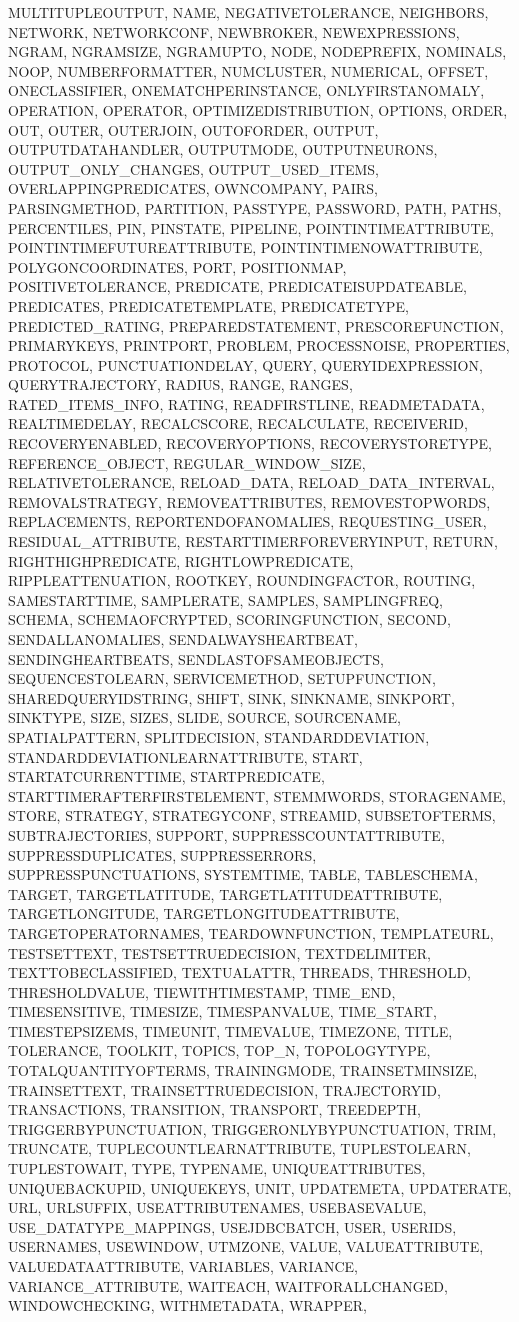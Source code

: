 {{MULTITUPLEOUTPUT, NAME, NEGATIVETOLERANCE, NEIGHBORS, NETWORK, NETWORKCONF, NEWBROKER, NEWEXPRESSIONS, NGRAM, NGRAMSIZE, NGRAMUPTO, NODE, NODEPREFIX, NOMINALS, NOOP, NUMBERFORMATTER, NUMCLUSTER, NUMERICAL, OFFSET, ONECLASSIFIER, ONEMATCHPERINSTANCE, ONLYFIRSTANOMALY, OPERATION, OPERATOR, OPTIMIZEDISTRIBUTION, OPTIONS, ORDER, OUT, OUTER, OUTERJOIN, OUTOFORDER, OUTPUT, OUTPUTDATAHANDLER, OUTPUTMODE, OUTPUTNEURONS, OUTPUT_ONLY_CHANGES, OUTPUT_USED_ITEMS, OVERLAPPINGPREDICATES, OWNCOMPANY, PAIRS, PARSINGMETHOD, PARTITION, PASSTYPE, PASSWORD, PATH, PATHS, PERCENTILES, PIN, PINSTATE, PIPELINE, POINTINTIMEATTRIBUTE, POINTINTIMEFUTUREATTRIBUTE, POINTINTIMENOWATTRIBUTE, POLYGONCOORDINATES, PORT, POSITIONMAP, POSITIVETOLERANCE, PREDICATE, PREDICATEISUPDATEABLE, PREDICATES, PREDICATETEMPLATE, PREDICATETYPE, PREDICTED_RATING, PREPAREDSTATEMENT, PRESCOREFUNCTION, PRIMARYKEYS, PRINTPORT, PROBLEM, PROCESSNOISE, PROPERTIES, PROTOCOL, PUNCTUATIONDELAY, QUERY, QUERYIDEXPRESSION, QUERYTRAJECTORY, RADIUS, RANGE, RANGES, RATED_ITEMS_INFO, RATING, READFIRSTLINE, READMETADATA, REALTIMEDELAY, RECALCSCORE, RECALCULATE, RECEIVERID, RECOVERYENABLED, RECOVERYOPTIONS, RECOVERYSTORETYPE, REFERENCE_OBJECT, REGULAR_WINDOW_SIZE, RELATIVETOLERANCE, RELOAD_DATA, RELOAD_DATA_INTERVAL, REMOVALSTRATEGY, REMOVEATTRIBUTES, REMOVESTOPWORDS, REPLACEMENTS, REPORTENDOFANOMALIES, REQUESTING_USER, RESIDUAL_ATTRIBUTE, RESTARTTIMERFOREVERYINPUT, RETURN, RIGHTHIGHPREDICATE, RIGHTLOWPREDICATE, RIPPLEATTENUATION, ROOTKEY, ROUNDINGFACTOR, ROUTING, SAMESTARTTIME, SAMPLERATE, SAMPLES, SAMPLINGFREQ, SCHEMA, SCHEMAOFCRYPTED, SCORINGFUNCTION, SECOND, SENDALLANOMALIES, SENDALWAYSHEARTBEAT, SENDINGHEARTBEATS, SENDLASTOFSAMEOBJECTS, SEQUENCESTOLEARN, SERVICEMETHOD, SETUPFUNCTION, SHAREDQUERYIDSTRING, SHIFT, SINK, SINKNAME, SINKPORT, SINKTYPE, SIZE, SIZES, SLIDE, SOURCE, SOURCENAME, SPATIALPATTERN, SPLITDECISION, STANDARDDEVIATION, STANDARDDEVIATIONLEARNATTRIBUTE, START, STARTATCURRENTTIME, STARTPREDICATE, STARTTIMERAFTERFIRSTELEMENT, STEMMWORDS, STORAGENAME, STORE, STRATEGY, STRATEGYCONF, STREAMID, SUBSETOFTERMS, SUBTRAJECTORIES, SUPPORT, SUPPRESSCOUNTATTRIBUTE, SUPPRESSDUPLICATES, SUPPRESSERRORS, SUPPRESSPUNCTUATIONS, SYSTEMTIME, TABLE, TABLESCHEMA, TARGET, TARGETLATITUDE, TARGETLATITUDEATTRIBUTE, TARGETLONGITUDE, TARGETLONGITUDEATTRIBUTE, TARGETOPERATORNAMES, TEARDOWNFUNCTION, TEMPLATEURL, TESTSETTEXT, TESTSETTRUEDECISION, TEXTDELIMITER, TEXTTOBECLASSIFIED, TEXTUALATTR, THREADS, THRESHOLD, THRESHOLDVALUE, TIEWITHTIMESTAMP, TIME_END, TIMESENSITIVE, TIMESIZE, TIMESPANVALUE, TIME_START, TIMESTEPSIZEMS, TIMEUNIT, TIMEVALUE, TIMEZONE, TITLE, TOLERANCE, TOOLKIT, TOPICS, TOP_N, TOPOLOGYTYPE, TOTALQUANTITYOFTERMS, TRAININGMODE, TRAINSETMINSIZE, TRAINSETTEXT, TRAINSETTRUEDECISION, TRAJECTORYID, TRANSACTIONS, TRANSITION, TRANSPORT, TREEDEPTH, TRIGGERBYPUNCTUATION, TRIGGERONLYBYPUNCTUATION, TRIM, TRUNCATE, TUPLECOUNTLEARNATTRIBUTE, TUPLESTOLEARN, TUPLESTOWAIT, TYPE, TYPENAME, UNIQUEATTRIBUTES, UNIQUEBACKUPID, UNIQUEKEYS, UNIT, UPDATEMETA, UPDATERATE, URL, URLSUFFIX, USEATTRIBUTENAMES, USEBASEVALUE, USE_DATATYPE_MAPPINGS, USEJDBCBATCH, USER, USERIDS, USERNAMES, USEWINDOW, UTMZONE, VALUE, VALUEATTRIBUTE, VALUEDATAATTRIBUTE, VARIABLES, VARIANCE, VARIANCE_ATTRIBUTE, WAITEACH, WAITFORALLCHANGED, WINDOWCHECKING, WITHMETADATA, WRAPPER, }}
